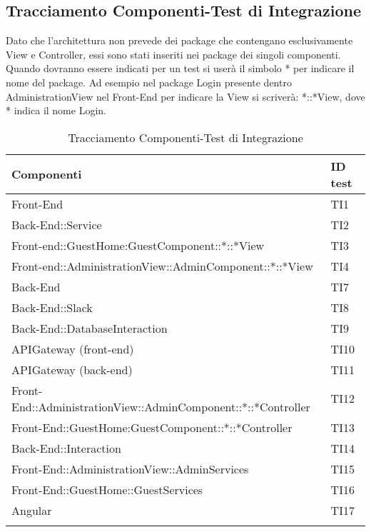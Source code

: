 \documentclass[../PianoDiQualifica.tex]{subfiles}
\begin{document}
	\newpage
	\subsection{Tracciamento Componenti-Test di Integrazione}
	Dato che l'architettura non prevede dei package che contengano esclusivamente View e Controller, essi sono stati inseriti nei package dei singoli componenti. Quando dovranno essere indicati per un test si userà il simbolo * per indicare il nome del package. Ad esempio nel package Login presente dentro AdministrationView nel Front-End per indicare la View si scriverà: *::*View, dove * indica il nome Login.
	\begin{longtable}[c] { >{\centering\arraybackslash}p{11cm} >{\centering\arraybackslash}p{2cm}}
		\toprule
		\centerline{\textbf{Componenti}} & \centerline{\textbf{ID test}} \\
			\midrule
			Front-End & TI1 \\ 
			\addlinespace[0.3em]
			\midrule
			\addlinespace[0.3em]
			Back-End::Service & TI2 \\
			\addlinespace[0.3em]
			\midrule
			\addlinespace[0.3em]
			Front-end::GuestHome:GuestComponent::*::*View & TI3 \\
			\addlinespace[0.3em]
			\midrule
			\addlinespace[0.3em]
			Front-end::AdministrationView::AdminComponent::*::*View & TI4\\
			\addlinespace[0.3em]
			\midrule
			\addlinespace[0.3em]
			Back-End & TI7\\
			\addlinespace[0.3em]
			\midrule
			\addlinespace[0.3em]
			Back-End::Slack & TI8\\
			\addlinespace[0.3em]
			\midrule
			\addlinespace[0.3em]
			Back-End::DatabaseInteraction & TI9 \\
			\addlinespace[0.3em]
			\midrule
			\addlinespace[0.3em]
			APIGateway (front-end) & TI10\\
			\addlinespace[0.3em]
			\midrule
			\addlinespace[0.3em]	
			APIGateway (back-end) & TI11\\
			\addlinespace[0.3em]
			\midrule
			\addlinespace[0.3em]
			Front-End::AdministrationView::AdminComponent::*::*Controller & TI12\\
			\addlinespace[0.3em]
			\midrule
			\addlinespace[0.3em]
			Front-End::GuestHome:GuestComponent::*::*Controller & TI13\\
			\addlinespace[0.3em]
			\midrule
			\addlinespace[0.3em]
			Back-End::Interaction & TI14 \\
			\addlinespace[0.3em]
			\midrule
			\addlinespace[0.3em]
			Front-End::AdministrationView::AdminServices & TI15\\
			\addlinespace[0.3em]
			\midrule
			\addlinespace[0.3em]
			Front-End::GuestHome::GuestServices & TI16 \\
			\addlinespace[0.3em]
			\midrule
			\addlinespace[0.3em]
			Angular & TI17\\
			\bottomrule
			\caption{Tracciamento Componenti-Test di Integrazione}
	\end{longtable}
	
\end{document}
